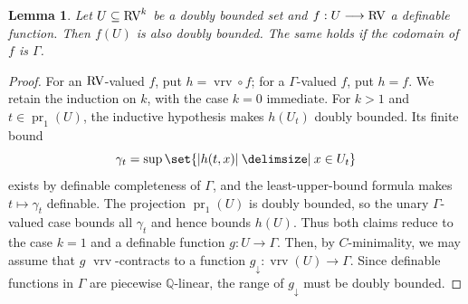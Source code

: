 \documentclass[12pt]{amsart}
\theoremstyle{plain}
\newtheorem{lem}[thm]{Lemma}
\theoremstyle{definition}
\theoremstyle{remark}
\numberwithin{equation}{section}
\theoremstyle{plain}
\newcommand{\RV}{\textup{RV}}
\DeclareMathOperator{\pr}{pr}
\newcommand{\Q}{\mathds{Q}}
\newcommand{\cmin}{$C$\nobreakdash}
\newcommand{\0}{\emptyset}
\newcommand{\fun}{\longrightarrow}
\newcommand{\efun}{\longmapsto}
\newcommand{\sub}{\subseteq}
\providecommand\given{}
\newcommand\SetSymbol[1][]{%
\nonscript \: #1 \vert
\allowbreak
\nonscript\:
\mathopen{}}
\renewcommand\given{\SetSymbol[\delimsize]}
\DeclareMathOperator{\vrv}{vrv}
\begin{document}
\begin{lem}\label{db:to:db}
Let $U \sub \RV^k$ be a doubly bounded set and $f: U \fun \RV$ a definable function. Then $f(U)$ is also doubly bounded. The same holds if the codomain of $f$ is $\Gamma$.
\end{lem}
\begin{proof}
For an $\RV$-valued $f$, put $h=\vrv\circ f$; for a $\Gamma$-valued $f$, put $h=f$. We retain the induction on $k$, with the case $k=0$ immediate. For $k>1$ and $t\in\pr_1(U)$, the inductive hypothesis makes $h(U_t)$ doubly bounded. Its finite bound
\[
\gamma_t=\sup\set{|h(t,x)|\given x\in U_t}
\]
exists by definable completeness of $\Gamma$, and the least-upper-bound formula makes $t\efun\gamma_t$ definable. The projection $\pr_1(U)$ is doubly bounded, so the unary $\Gamma$-valued case bounds all $\gamma_t$ and hence bounds $h(U)$. Thus both claims reduce to the case $k=1$ and a definable function $g:U\fun\Gamma$. Then, by \cmin-minimality, we may assume that $g$  $\vrv$-contracts to a function $g_{\downarrow} : \vrv(U) \fun \Gamma$. Since definable functions in $\Gamma$ are piecewise $\Q$-linear, the range of $g_{\downarrow}$ must be doubly bounded.
\end{proof}
\end{document}
